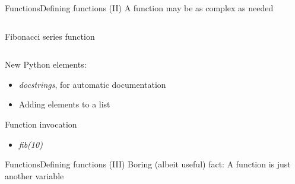 \documentclass[10pt,compress]{beamer} %
\begin{document}
\begin{frame}{Functions}{Defining functions (II)}
	A function may be as complex as needed
    \begin{columns}
		\vspace{-0.2cm}
		\begin{block}{Fibonacci series function}
		\vspace{-0.2cm}
		
		\end{block}
	\end{columns}
	\medskip
	New Python elements:
	\begin{itemize}
		\item \small \textit{docstrings}, for automatic documentation
		\item \small Adding elements to a list
	\end{itemize}

    Function invocation 
	\begin{itemize}
        \item \textit{fib(10)}
	\end{itemize}
\end{frame}

\begin{frame}{Functions}{Defining functions (III)}
	Boring (albeit useful) fact: A function is just another variable
    \begin{columns}
		\begin{exampleblock}{}
		\vspace{-0.2cm}
		
		\vspace{-0.2cm}
		\end{exampleblock}
	\end{columns}
\end{frame}
\end{document}
